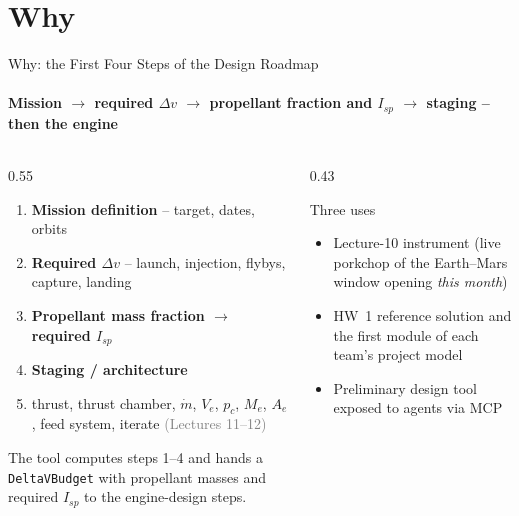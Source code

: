 \documentclass[aspectratio=169,10pt]{beamer}
\newcommand{\Isp}{{I_{sp}}}\newcommand{\dv}{\Delta v}\newcommand{\vinf}{v_\infty}\newcommand{\gz}{g_0}\newcommand{\dd}{\mathrm{d}}
\newcommand{\code}[1]{\texttt{#1}}
\begin{document}
\section{Why}
\begin{frame}{Why: the First Four Steps of the Design Roadmap}
  \framesubtitle{Mission $\to$ required $\dv$ $\to$ propellant fraction and $\Isp$ $\to$ staging -- then the engine}
\small
\begin{columns}[T]
\begin{column}{0.55\textwidth}
\begin{enumerate}
\item \textbf{Mission definition} -- target, dates, orbits
\item \textbf{Required $\dv$} -- launch, injection, flybys, capture, landing
\item \textbf{Propellant mass fraction $\rightarrow$ required $I_{sp}$}
\item \textbf{Staging / architecture}
\item[5--10.] thrust, thrust chamber, $\dot m$, $V_e$, $p_c$, $M_e$, $A_e$, feed system, iterate \hfill \textcolor{gray}{(Lectures 11--12)}
\end{enumerate}
\medskip
The tool computes steps 1--4 and hands a \code{DeltaVBudget} with propellant masses and required $I_{sp}$ to the engine-design steps.
\end{column}
\begin{column}{0.43\textwidth}
\begin{block}{Three uses}
\begin{itemize}
\item Lecture-10 instrument (live porkchop of the Earth--Mars window opening \emph{this month})
\item HW~1 reference solution and the first module of each team's project model
\item Preliminary design tool exposed to agents via MCP
\end{itemize}
\end{block}
\end{column}
\end{columns}
\end{frame}

\end{document}
